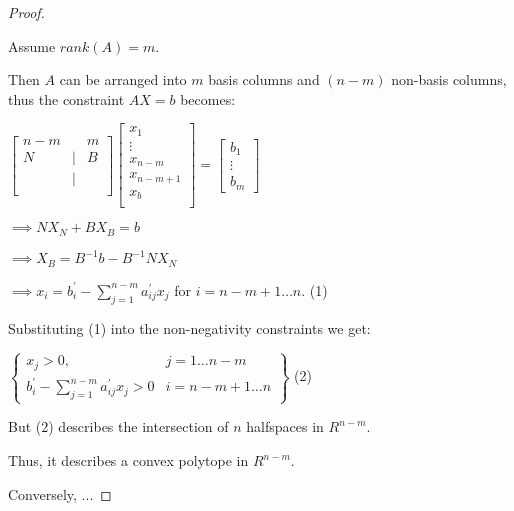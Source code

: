 \documentclass{article}
\begin{document}
\begin{proof}
  $ $
  
  Assume $rank(A) = m$.

  Then $A$ can be arranged into $m$ basis columns and $(n-m)$ non-basis columns, thus the constraint $AX=b$ becomes:

  $\begin{bmatrix}
    n-m &  & m \\
    N &   | & B \\
        & | &   \\
  \end{bmatrix}
  \begin{bmatrix}
  x_1       \\
  \vdots    \\
  x_{n-m}   \\
  x_{n-m+1} \\
  x_{b}     \\
  \end{bmatrix}
  =
  \begin{bmatrix}
    b_1 \\
    \vdots \\
    b_m  
  \end{bmatrix}$
  \newline

  \noindent
  $\implies NX_N + BX_B = b$

  \noindent
  $\implies X_B = B^{-1}b - B^{-1}NX_N$

  \noindent
  $\implies x_i = b_i^\prime - \sum_{j=1}^{n-m}a_{ij}^\prime x_j$ \qquad for $i=n-m+1 \ldots n$. \qquad (1)
  \newline

  Substituting (1) into the non-negativity constraints we get:
  \newline
  
  $\begin{Bmatrix}
    x_j > 0, & j = 1 \ldots n-m \\
    b_i^\prime - \sum_{j=1}^{n-m}a_{ij}^\prime x_j > 0  & i=n-m+1 \ldots n
  \end{Bmatrix}$ \qquad (2)
  \newline
  \newline


  But (2) describes the intersection of $n$ halfspaces in $R^{n-m}$.
  
  Thus, it describes a convex polytope in $R^{n-m}$.
  \newline
  
  Conversely, ... 

\end{proof}
\end{document}

